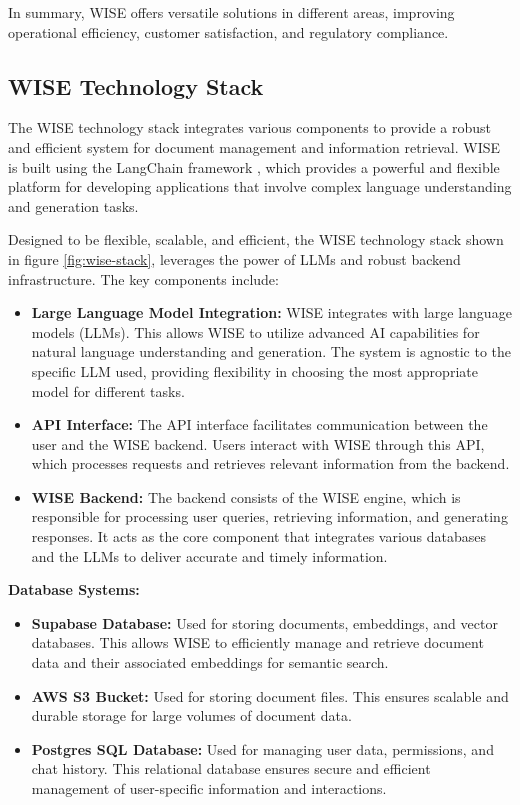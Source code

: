 In summary, WISE offers versatile solutions in different areas, improving operational efficiency, customer satisfaction, and regulatory compliance. \cite{hpa2024}

\subsection{WISE Technology Stack}

The WISE technology stack integrates various components to provide a robust and efficient system for document management and information retrieval. WISE is built using the LangChain framework \cite{langchain2024}, which provides a powerful and flexible platform for developing applications that involve complex language understanding and generation tasks.

Designed to be flexible, scalable, and efficient, the WISE technology stack shown in figure \ref{fig:wise-stack}, leverages the power of LLMs and robust backend infrastructure. The key components include:

\begin{itemize}
    \item \textbf{Large Language Model Integration:} WISE integrates with large language models (LLMs). This allows WISE to utilize advanced AI capabilities for natural language understanding and generation. The system is agnostic to the specific LLM used, providing flexibility in choosing the most appropriate model for different tasks.

    \item \textbf{API Interface:} The API interface facilitates communication between the user and the WISE backend. Users interact with WISE through this API, which processes requests and retrieves relevant information from the backend.

    \item \textbf{WISE Backend:} The backend consists of the WISE engine, which is responsible for processing user queries, retrieving information, and generating responses. It acts as the core component that integrates various databases and the LLMs to deliver accurate and timely information.
\end{itemize}

\textbf{Database Systems:} 

    \begin{itemize}
        \item \textbf{Supabase Database:} Used for storing documents, embeddings, and vector databases. This allows WISE to efficiently manage and retrieve document data and their associated embeddings for semantic search.
        \item \textbf{AWS S3 Bucket:} Used for storing document files. This ensures scalable and durable storage for large volumes of document data.
        \item \textbf{Postgres SQL Database:} Used for managing user data, permissions, and chat history. This relational database ensures secure and efficient management of user-specific information and interactions.
    \end{itemize}

